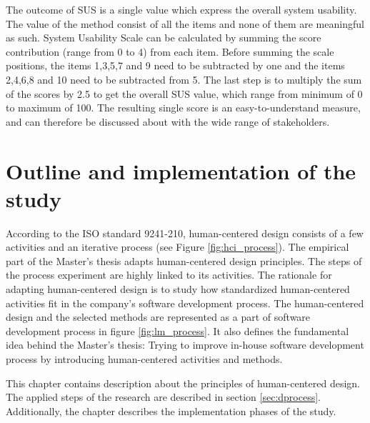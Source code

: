 \documentclass[12pt,a4paper,oneside,pdftex]{report}
\begin{document}
The outcome of SUS is a single value which express the overall system usability. The value of the method consist of all the items and none of them are meaningful as such. System Usability Scale can be calculated by summing the score contribution (range from 0 to 4) 		from each item. Before summing the scale positions, the items 1,3,5,7 and 9 need to be subtracted by one and the items 2,4,6,8 and 10 need to be subtracted from 5. The last step is to multiply the sum of the scores by 2.5 to get the overall SUS value, which range from minimum of 0 to maximum of 100. \citep{RefWorks:10} The resulting single score is an easy-to-understand measure, and can therefore be discussed about with the wide range of stakeholders. \citep{RefWorks:12} 
    
\chapter{Outline and implementation of the study}
\label{chapter:implementation}

According to the ISO standard 9241-210, human-centered design consists of a few activities and an iterative process (see Figure \ref{fig:hci_process}). \citep{RefWorks:40} The empirical part of the Master's thesis adapts human-centered design principles. The steps of the process experiment are highly linked to its activities. The rationale for adapting human-centered design is to study how standardized human-centered activities fit in the company's software development process. The human-centered design and the selected methods are represented as a part of software development process in figure \ref{fig:lm_process}. It also defines the fundamental idea behind the Master's thesis: Trying to improve in-house software development process by introducing human-centered activities and methods.

This chapter contains description about the principles of human-centered design. The applied steps of the research are described in section \ref{sec:dprocess}. Additionally, the chapter describes the implementation phases of the study. 
\end{document}
